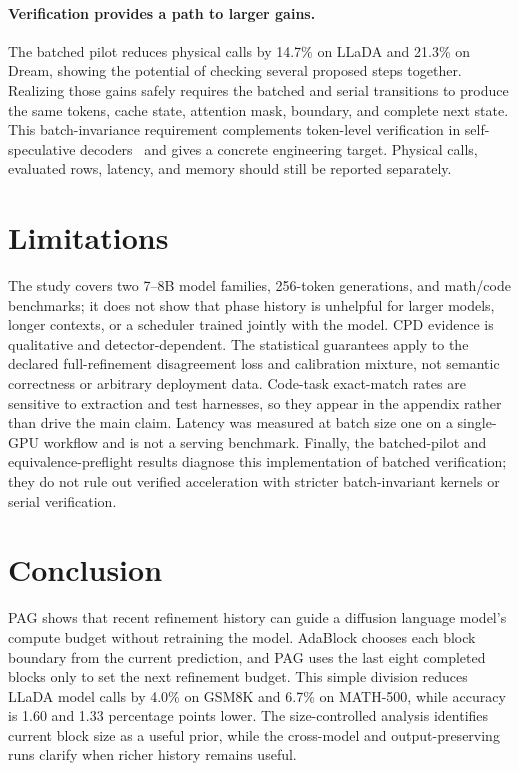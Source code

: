 \documentclass{article}
\begin{document}
\paragraph{Verification provides a path to larger gains.}
The batched pilot reduces physical calls by 14.7\% on LLaDA and 21.3\% on Dream, showing the potential of checking several proposed steps together. Realizing those gains safely requires the batched and serial transitions to produce the same tokens, cache state, attention mask, boundary, and complete next state. This batch-invariance requirement complements token-level verification in self-speculative decoders~\citep{gao2025ssd,han2026s2d2} and gives a concrete engineering target. Physical calls, evaluated rows, latency, and memory should still be reported separately.

\section{Limitations}
\label{sec:limitations}

The study covers two 7--8B model families, 256-token generations, and math/code benchmarks; it does not show that phase history is unhelpful for larger models, longer contexts, or a scheduler trained jointly with the model. CPD evidence is qualitative and detector-dependent. The statistical guarantees apply to the declared full-refinement disagreement loss and calibration mixture, not semantic correctness or arbitrary deployment data. Code-task exact-match rates are sensitive to extraction and test harnesses, so they appear in the appendix rather than drive the main claim. Latency was measured at batch size one on a single-GPU workflow and is not a serving benchmark. Finally, the batched-pilot and equivalence-preflight results diagnose this implementation of batched verification; they do not rule out verified acceleration with stricter batch-invariant kernels or serial verification.

\section{Conclusion}
\label{sec:conclusion}

PAG shows that recent refinement history can guide a diffusion language model's compute budget without retraining the model. AdaBlock chooses each block boundary from the current prediction, and PAG uses the last eight completed blocks only to set the next refinement budget. This simple division reduces LLaDA model calls by 4.0\% on GSM8K and 6.7\% on MATH-500, while accuracy is 1.60 and 1.33 percentage points lower. The size-controlled analysis identifies current block size as a useful prior, while the cross-model and output-preserving runs clarify when richer history remains useful.
\end{document}
